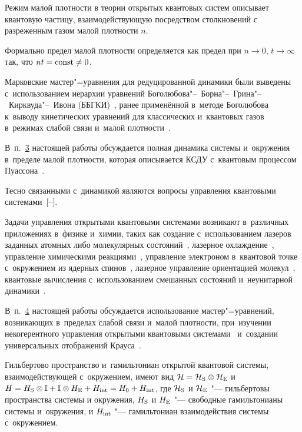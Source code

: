 Режим малой плотности в теории открытых квантовых систем описывает квантовую частицу, взаимодействующую посредством столкновений с разреженным газом малой плотности $n$. 

Формально предел малой плотности определяется как предел при $n\to 0$, $t\to\infty$ так, что $nt={\rm const}\ne 0$. 

Марковские мастер"=уравнения для редуцированной динамики были выведены с~использованием иерархии уравнений Боголюбова"--~Борна"--~Грина"--~Кирквуда"--~Ивона (ББГКИ)~\cite{Dumcke}, ранее применённой в~методе Боголюбова к~выводу кинетических уравнений для классических и~квантовых газов в~режимах слабой связи и~малой плотности~\cite{Bogoliubov2006}. 

В~п.~\hyperlink{Sec:LDL}{3} настоящей работы обсуждается полная динамика системы и~окружения в~пределе малой плотности, которая описывается КСДУ с~квантовым процессом Пуассона~\cite{LDL:QSDE, LDL:QSDE2}.



Тесно связанными с~динамикой являются вопросы управления квантовыми системами~[--]. 

Задачи управления открытыми квантовыми системами возникают в~различных приложениях в~физике и~химии, таких как создание с~использованием лазеров заданных атомных либо молекулярных состояний~\cite{Rice2000}, лазерное охлаждение~\cite{Letokhov2007}, управление химическими реакциями~\cite{Tannor1983, Dantus2004}, управление электроном в~квантовой точке с~окружением из ядерных спинов~\cite{Ruskov2002}, лазерное управление ориентацией молекул~\cite{Orientation}, квантовые вычисления с~использованием смешанных состояний и~неунитарной динамики~\cite{Tarasov}. 

В~п.~\hyperlink{Sec:control}{4} настоящей работы обсуждается использование мастер"=уравнений, возникающих в~пределах слабой связи и~малой плотности, при~изучении некогерентного управления открытыми квантовыми системами~\cite{ice1} и~создании универсальных отображений Крауса~\cite{Wu07}.



\smallskip


Гильбертово пространство и~гамильтониан открытой квантовой системы, взаимодействующей с~окружением, имеют вид ${\cal H}={\cal H}_{\rm S}\otimes{\cal H}_{\rm E}$ и $H=H_{\rm S}\otimes\mathbb I+\mathbb I\otimes H_{\rm E}+H_{\rm int}=H_0+H_{\rm int}$, где ${\cal H}_{\rm S}$ и ${\cal H}_{\rm E}$ "--- гильбертовы пространства системы и окружения, $H_{\rm S}$ и $H_{\rm E}$ "--- свободные гамильтонианы системы и~окружения, и $H_{\rm int}$ "--- гамильтониан взаимодействия системы с~окружением. 

